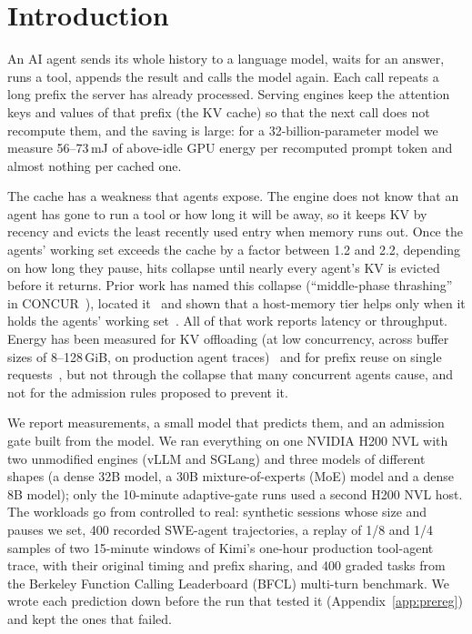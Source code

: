 \section{Introduction}

An AI agent sends its whole history to a language model, waits for an answer, runs a tool, appends the result and
calls the model again. Each call repeats a long prefix the server has already processed. Serving engines keep the
attention keys and values of that prefix (the KV cache) so that the next call does not recompute them, and the saving
is large: for a 32-billion-parameter model we measure 56--73\,mJ of above-idle GPU energy per recomputed prompt token and
almost nothing per cached one.

The cache has a weakness that agents expose. The engine does not know that an agent has gone to run a tool or how long
it will be away, so it keeps KV by recency and evicts the least recently used entry when memory runs out. Once the agents'
working set exceeds the cache by a factor between 1.2 and 2.2, depending on how long they pause, hits collapse until nearly every agent's KV is evicted before it returns. Prior work has named this collapse
(``middle-phase thrashing'' in CONCUR~\cite{chen2026concur}), located it~\cite{he2026robot,lu2026metastability} and
shown that a host-memory tier helps only when it holds the agents' working set~\cite{shao2026efficientagent}. All of
that work reports latency or throughput. Energy has been measured for KV offloading (at low concurrency, across
buffer sizes of 8--128\,GiB, on production agent traces)~\cite{mao2026offloading} and for prefix reuse on single
requests~\cite{shewale2026prefixbench}, but not through the collapse that many concurrent agents cause, and not for
the admission rules proposed to prevent it.

We report measurements, a small model that predicts them, and an admission gate built from the model. We ran
everything on one NVIDIA H200 NVL with two unmodified engines (vLLM and SGLang) and three models of different shapes (a
dense 32B model, a 30B mixture-of-experts (MoE) model and a dense 8B model); only the 10-minute adaptive-gate runs used a second H200 NVL host. The workloads go from controlled to real:
synthetic sessions whose size and pauses we set, 400 recorded SWE-agent trajectories, a replay of 1/8 and 1/4 samples of two 15-minute windows of
Kimi's one-hour production tool-agent trace, with their original timing and prefix sharing, and 400 graded tasks from the
Berkeley Function Calling Leaderboard (BFCL) multi-turn benchmark. We wrote each prediction down before the run that
tested it (Appendix~\ref{app:prereg}) and kept the ones that failed.

